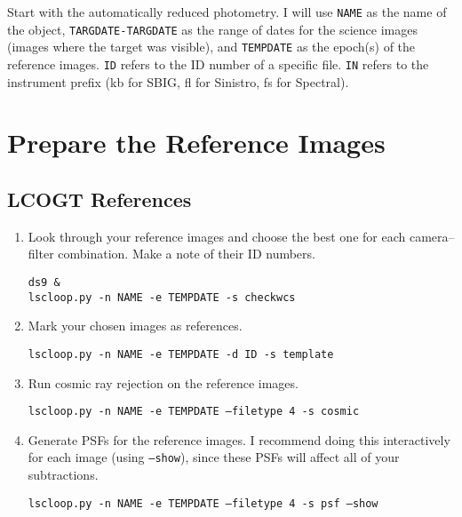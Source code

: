 Start with the automatically reduced photometry. I will use {\tt NAME} as the name of the object, {\tt TARGDATE-TARGDATE} as the range of dates for the science images (images where the target was visible), and {\tt TEMPDATE} as the epoch(s) of the reference images. {\tt ID} refers to the ID number of a specific file. {\tt IN} refers to the instrument prefix (kb for SBIG, fl for Sinistro, fs for Spectral).

\section{Prepare the Reference Images}
\subsection{LCOGT References}
\begin{enumerate}

\item Look through your reference images and choose the best one for each camera--filter combination. Make a note of their ID numbers.

{\tt ds9 \& } \\
{\tt lscloop.py -n NAME -e TEMPDATE -s checkwcs}

\item Mark your chosen images as references.

{\tt lscloop.py -n NAME -e TEMPDATE -d ID -s template}

\item Run cosmic ray rejection on the reference images.

{\tt lscloop.py -n NAME -e TEMPDATE --filetype 4 -s cosmic}

\item Generate PSFs for the reference images. I recommend doing this interactively for each image (using {\tt --show}), since these PSFs will affect all of your subtractions.

{\tt lscloop.py -n NAME -e TEMPDATE --filetype 4 -s psf --show}

\end{enumerate}

